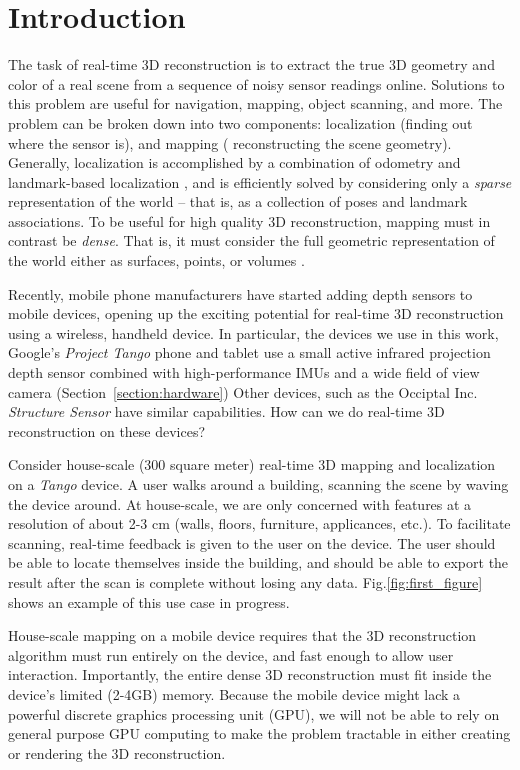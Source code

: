 \documentclass[10pt,twocolumn,letterpaper]{article}
\newcommand{\sref}[1]{Section~\ref{#1}}
\newcommand{\figref}[1]{Fig.\ref{#1}}
\begin{document}
\section{Introduction}
The task of real-time 3D reconstruction \cite{Hartley2004} is to extract the
true 3D geometry and color of a real scene from a sequence of noisy sensor readings
online. Solutions to this problem are useful for navigation, mapping, object
scanning, and more. The problem can be broken down into two components:
localization (\ie finding out where the sensor is), and mapping (\ie
reconstructing the scene geometry). Generally, localization is accomplished by a
combination of odometry \cite{VINS} and landmark-based localization
\cite{FastSlam}, and is efficiently solved by considering only a \textit{sparse}
representation of the world -- that is, as a collection of poses and landmark
associations. To be useful for high quality 3D reconstruction, mapping must in
contrast be \textit{dense}. That is, it must consider the full geometric
representation of the world either as surfaces, points, or volumes
\cite{Hartley2004}.  

Recently, mobile phone manufacturers have started adding
depth sensors to mobile devices, opening up the exciting potential for
real-time 3D reconstruction using a wireless, handheld device. In particular,
the devices we use in this work, Google's \textit{Project Tango} \cite{Tango}
phone and tablet use a small active infrared projection depth  sensor combined
with high-performance IMUs and a wide field of view camera (\sref{section:hardware}) Other devices, such as the Occiptal Inc.
\textit{Structure Sensor} \cite{StructureSensor} have similar capabilities.  How
can we do real-time 3D reconstruction on these devices?

Consider house-scale (300 square meter) real-time 3D mapping and localization on
a \textit{Tango} device.  A user walks around a building, scanning the scene by
waving the device around. At house-scale, we are only concerned with features
at a resolution of about 2-3 cm (walls, floors, furniture, applicances, etc.).
To facilitate scanning, real-time feedback is given to the user on the device.
The user should be able to locate themselves inside the building, and should be
able to export the result after the scan is complete without losing any data.
\figref{fig:first_figure} shows an example of this use case in progress.

House-scale mapping on a mobile device requires that the 3D reconstruction
algorithm must run entirely on the device, and fast enough to allow user
interaction. Importantly, the entire dense 3D reconstruction must fit inside
the device's limited (2-4GB) memory. Because the mobile device might lack a
powerful discrete graphics processing unit (GPU), we will not be able to rely
on general purpose GPU computing to make the problem tractable in either
creating or rendering the 3D reconstruction.
\end{document}
